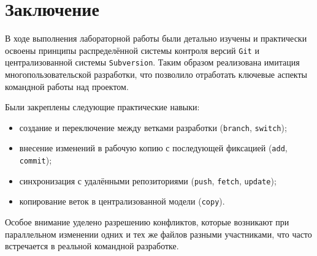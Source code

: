 \section{Заключение}

В ходе выполнения лабораторной работы были детально изучены и практически освоены принципы распределённой системы контроля версий \texttt{Git} и централизованной системы \texttt{Subversion}. Таким образом реализована имитация многопользовательской разработки, что позволило отработать ключевые аспекты командной работы над проектом.

Были закреплены следующие практические навыки:

\begin{itemize}
  \item создание и переключение между ветками разработки (\texttt{branch}, \texttt{switch});
  \item внесение изменений в рабочую копию с последующей фиксацией (\texttt{add}, \texttt{commit});
  \item синхронизация с удалёнными репозиториями (\texttt{push}, \texttt{fetch}, \texttt{update});
  \item копирование веток в централизованной модели (\texttt{copy}).
\end{itemize}

Особое внимание уделено разрешению конфликтов, которые возникают при параллельном изменении одних и тех же файлов разными участниками, что часто встречается в реальной командной разработке.